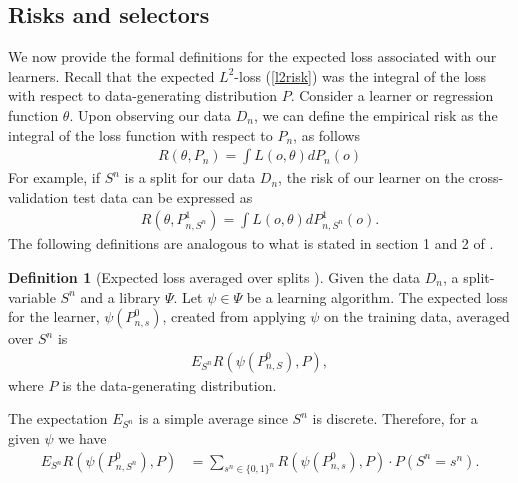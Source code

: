\documentclass[11pt, a4paper]{article}
\theoremstyle{definition}
\newtheorem{definition}[theorem]{Definition}
\theoremstyle{remark}
\newcommand{\btheta}{\theta}
\newcommand{\la}{\psi}
\newcommand{\Sn}{S^n}
\newcommand{\lib}{\Psi}
\begin{document}
\subsection{Risks and selectors}
We now provide the formal definitions for the expected loss associated with our learners. Recall that the expected $L^2$-loss (\ref{l2risk}) was the integral of the loss with respect to data-generating distribution $P$. Consider a learner or regression function $ \theta $. Upon observing our data $D_n$, we can define the empirical risk as the integral of the loss function with respect to $P_n$, as follows
\begin{align*}
    R(\btheta , P_n) = \int L(o, \btheta) d P_{n}(o) 
\end{align*}
For example, if $\Sn$ is a split for our data $D_n$, the risk of our learner on the cross-validation test data can be expressed as
 \begin{align*}
     R(\theta, P_{n, \Sn}^{1}) =  \int L(o, \btheta) d P_{n,\Sn}^{1}(o).
 \end{align*}
 The following definitions are analogous to what is stated in section 1 and 2 of  \parencite{laan03}.
 \begin{definition}[Expected loss averaged over splits \parencite{vaart06}]
     Given the data $D_n$, a split-variable $\Sn$ and a library $ \lib $. Let $ \la \in \lib $ be a learning algorithm. The expected loss for the learner, $\la(P_{n,s}^0)$, created from applying $ \la $ on the training data, averaged over $ \Sn $ is  
    \begin{align*}
        E_{\Sn} R( \la(P_{n,S}^{0}), P),
    \end{align*}
    where $ P $ is the data-generating distribution.
\end{definition}
The expectation $ E_{\Sn} $ is a simple average since $ \Sn $ is discrete. Therefore, for a given $ \la $ we have 
\begin{align*}
    E_{\Sn} R( \la(P_{n,\Sn}^{0}), P) &= \sum_{s^{n} \in \{0,1\}^{n}} R(\la(P_{n, s}^{0}), P) \cdot P(\Sn = s^{n}). 
\end{align*}
\end{document}
